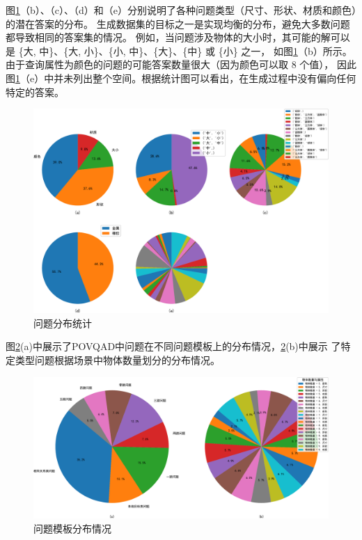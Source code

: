 图\ref{fig:question_statistics}（b）、（c）、（d）和（e）分别说明了各种问题类型（尺寸、形状、材质和颜色）的潜在答案的分布。
生成数据集的目标之一是实现均衡的分布，避免大多数问题都导致相同的答案集的情况。
例如，当问题涉及物体的大小时，其可能的解可以是
 \{大, 中\}、\{大, 小\}、\{小, 中\}、\{大\}、\{中\} 或 \{小\} 之一，
 如图\ref{fig:question_statistics}（b）所示。由于查询属性为颜色的问题的可能答案数量很大（因为颜色可以取 8 个值），
 因此图\ref{fig:question_statistics}（e）中并未列出整个空间。根据统计图可以看出，在生成过程中没有偏向任何特定的答案。
\begin{figure}[h]
    \centering
    \includegraphics[width=\textwidth]{figures/question_distribution-crop.pdf}
    \caption{问题分布统计}
    \label{fig:question_statistics}
\end{figure}

图\ref{fig:template_statistics}(a)中展示了POVQAD中问题在不同问题模板上的分布情况，\ref{fig:template_statistics}(b)中展示
了特定类型问题根据场景中物体数量划分的分布情况。
\begin{figure}[h]
    \centering
    \includegraphics[scale=0.45]{figures/question_template_distribution-crop.pdf}
    \caption{问题模板分布情况}
    \label{fig:template_statistics}
\end{figure}
